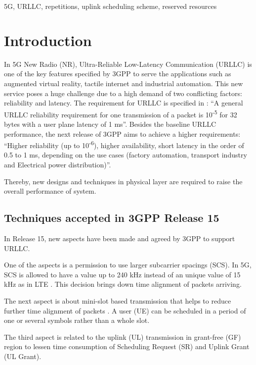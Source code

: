 \documentclass[conference]{IEEEtran}
\begin{document}
\begin{IEEEkeywords}
5G, URLLC, repetitions, uplink scheduling scheme, reserved resources
\end{IEEEkeywords}

\section{Introduction} \label{I}
In 5G New Radio (NR), Ultra-Reliable Low-Latency Communication (URLLC) is one of the key features specified by 3GPP to serve the applications such as augmented virtual reality, tactile internet and industrial automation. This new service poses a huge challenge due to a high demand of two conflicting factors: reliability and latency. The requirement for URLLC is specified in \cite{b6}: ``A general URLLC reliability requirement for one transmission of a packet is 10\textsuperscript{-5} for 32 bytes with a user plane latency of 1 ms''. Besides the baseline URLLC performance, the next release of 3GPP aims to achieve a higher requirements: ``Higher reliability (up to 10\textsuperscript{-6}), higher availability, short latency in the order of 0.5 to 1 ms, depending on the use cases (factory automation, transport industry and Electrical power distribution)''\cite{b8}.

Thereby, new designs and techniques in physical layer are required to raise the overall performance of system.

\subsection{Techniques accepted in 3GPP Release 15}\label{IAA}
In Release 15, new aspects have been made and agreed by 3GPP to support URLLC. 

One of the aspects is a permission to use larger subcarrier spacings (SCS). In 5G, SCS is allowed to have a value up to 240 kHz instead of an unique value of 15 kHz as in LTE \cite{ad2}. This decision brings down time alignment of packets arriving. 

The next aspect is about mini-slot based transmission that helps to reduce further time alignment of packets \cite{ad3}. A user (UE) can be scheduled in a period of one or several symbols rather than a whole slot. 

The third aspect is related to the uplink (UL) transmission in grant-free (GF) region to lessen time consumption of Scheduling Request (SR) and Uplink Grant (UL Grant)\cite{ad4}.
\end{document}
